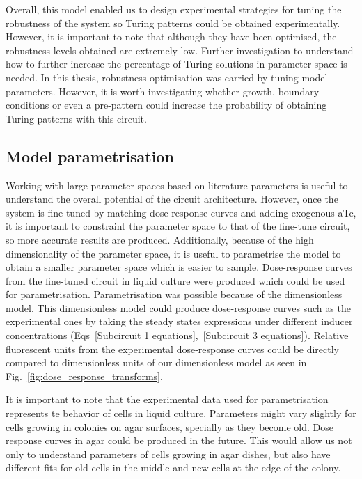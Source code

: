 Overall, this model enabled us to design experimental strategies for tuning the robustness of the system so Turing patterns could be obtained experimentally.
However, it is important to note that although they have been optimised, the robustness levels obtained are extremely low.
Further investigation to understand how to further increase the percentage of Turing solutions in parameter space is needed.
In this thesis, robustness optimisation was carried by tuning model parameters.
However, it is worth investigating whether growth, boundary conditions or even a pre-pattern could increase the probability of obtaining Turing patterns with this circuit.



\subsection{Model parametrisation}
Working with large parameter spaces based on literature parameters is useful to understand the overall potential of the circuit architecture.
However, once the system is fine-tuned by matching dose-response curves and adding exogenous aTc, it is important to constraint the parameter space to that of the fine-tune circuit, so more accurate results are produced.
Additionally, because of the high dimensionality of the parameter space, it is useful to parametrise the model to obtain a smaller parameter space which is easier to sample.
Dose-response curves from the fine-tuned circuit in liquid culture were produced which could be used for parametrisation.
Parametrisation was possible because of the dimensionless model.
This dimensionless model could produce dose-response curves such as the experimental ones by taking the steady states expressions under different inducer concentrations (Eqs~\ref{Subcircuit 1 equations},~\ref{Subcircuit 3 equations}).
Relative fluorescent units from the experimental dose-response curves could be directly compared to dimensionless units of our dimensionless model as seen in Fig.~\ref{fig:dose_response_transforms}.

It is important to note that the experimental data used for parametrisation represents te behavior of cells in liquid culture.
Parameters might vary slightly for cells growing in colonies on agar surfaces, specially as they become old.
Dose response curves in agar could be produced in the future.
This would allow us not only to understand parameters of cells growing in agar dishes, but also have different fits for old cells in the middle and new cells at the edge of the colony.


